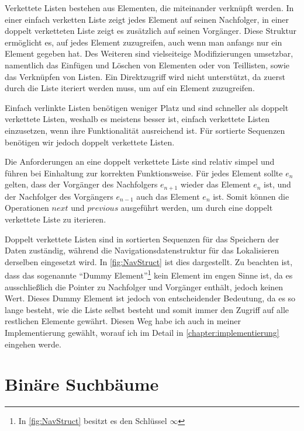 Verkettete Listen bestehen aus Elementen, die miteinander verknüpft werden. In einer einfach verketten Liste zeigt jedes Element auf seinen Nachfolger, in einer doppelt verketteten Liste zeigt es zusätzlich auf seinen Vorgänger. Diese Struktur ermöglicht es, auf jedes Element zuzugreifen, auch wenn man anfangs nur ein Element gegeben hat. Des Weiteren sind vielseiteige Modifizierungen umsetzbar, namentlich das Einfügen und Löschen von Elementen oder von Teillisten, sowie das Verknüpfen von Listen. Ein Direktzugriff wird nicht unterstützt, da zuerst durch die Liste iteriert werden muss, um auf ein Element zuzugreifen.
\par
Einfach verlinkte Listen benötigen weniger Platz und sind schneller als doppelt verkettete Listen, weshalb es meistens besser ist, einfach verkettete Listen einzusetzen, wenn ihre Funktionalität ausreichend ist. Für sortierte Sequenzen benötigen wir jedoch doppelt verkettete Listen. \cite{Sanders:19}
\par
Die Anforderungen an eine doppelt verkettete Liste sind relativ simpel und führen bei Einhaltung zur korrekten Funktionsweise. Für jedes Element sollte $e_n$ gelten, dass der Vorgänger des Nachfolgers $e_{n+1}$ wieder das Element $e_n$ ist, und der Nachfolger des Vorgängers $e_{n-1}$ auch das Element $e_n$ ist. Somit können die Operationen $next$ und $previous$ ausgeführt werden, um durch eine doppelt verkettete Liste zu iterieren.\cite{Sanders:19}
\par
Doppelt verkettete Listen sind in sortierten Sequenzen für das Speichern der Daten zuständig, während die Navigationsdatenstruktur für das Lokalisieren derselben eingesetzt wird. In \autoref{fig:NavStruct} ist dies dargestellt. Zu beachten ist, dass das sogenannte "`Dummy Element"'\footnote{In \autoref{fig:NavStruct} besitzt es den Schlüssel $\infty$} kein Element im engen Sinne ist, da es ausschließlich die Pointer zu Nachfolger und Vorgänger enthält, jedoch keinen Wert. Dieses Dummy Element ist jedoch von entscheidender Bedeutung, da es so lange besteht, wie die Liste selbst besteht und somit immer den Zugriff auf alle restlichen Elemente gewährt. Diesen Weg habe ich auch in meiner Implementierung gewählt, worauf ich im Detail in \autoref{chapter:implementierung} eingehen werde.


\section{Binäre Suchbäume}
\label{section:binary-trees}

